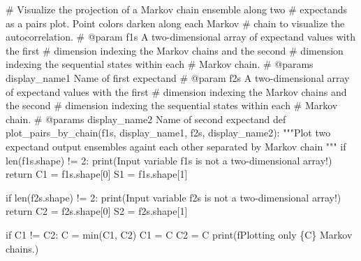 \documentclass[
  letterpaper,
  DIV=11,
  numbers=noendperiod]{scrartcl}
\newenvironment{Shaded}{\begin{snugshade}}{\end{snugshade}}
\newcommand{\BuiltInTok}[1]{\textcolor[rgb]{0.00,0.23,0.31}{#1}}
\newcommand{\CommentTok}[1]{\textcolor[rgb]{0.37,0.37,0.37}{#1}}
\newcommand{\ControlFlowTok}[1]{\textcolor[rgb]{0.00,0.23,0.31}{#1}}
\newcommand{\DecValTok}[1]{\textcolor[rgb]{0.68,0.00,0.00}{#1}}
\newcommand{\KeywordTok}[1]{\textcolor[rgb]{0.00,0.23,0.31}{#1}}
\newcommand{\NormalTok}[1]{\textcolor[rgb]{0.00,0.23,0.31}{#1}}
\newcommand{\OperatorTok}[1]{\textcolor[rgb]{0.37,0.37,0.37}{#1}}
\newcommand{\SpecialCharTok}[1]{\textcolor[rgb]{0.37,0.37,0.37}{#1}}
\newcommand{\SpecialStringTok}[1]{\textcolor[rgb]{0.13,0.47,0.30}{#1}}
\newcommand{\StringTok}[1]{\textcolor[rgb]{0.13,0.47,0.30}{#1}}
\begin{document}
\begin{Shaded}
\begin{Highlighting}[]
\CommentTok{\# Visualize the projection of a Markov chain ensemble along two}
\CommentTok{\# expectands as a pairs plot.  Point colors darken along each Markov}
\CommentTok{\# chain to visualize the autocorrelation.}
\CommentTok{\# @param f1s A two{-}dimensional array of expectand values with the first}
\CommentTok{\#            dimension indexing the Markov chains and the second}
\CommentTok{\#            dimension indexing the sequential states  within each}
\CommentTok{\#            Markov chain.}
\CommentTok{\# @params display\_name1 Name of first expectand}
\CommentTok{\# @param f2s A two{-}dimensional array of expectand values with the first}
\CommentTok{\#            dimension indexing the Markov chains and the second}
\CommentTok{\#            dimension indexing the sequential states  within each}
\CommentTok{\#            Markov chain.}
\CommentTok{\# @params display\_name2 Name of second expectand}
\KeywordTok{def}\NormalTok{ plot\_pairs\_by\_chain(f1s, display\_name1,}
\NormalTok{                        f2s, display\_name2):}
  \CommentTok{"""Plot two expectand output ensembles againt each other separated by}
\CommentTok{     Markov chain """}
  \ControlFlowTok{if} \BuiltInTok{len}\NormalTok{(f1s.shape) }\OperatorTok{!=} \DecValTok{2}\NormalTok{:}
    \BuiltInTok{print}\NormalTok{(}\StringTok{\textquotesingle{}Input variable \textasciigrave{}f1s\textasciigrave{} is not a two{-}dimensional array!\textquotesingle{}}\NormalTok{)}
    \ControlFlowTok{return}
\NormalTok{  C1 }\OperatorTok{=}\NormalTok{ f1s.shape[}\DecValTok{0}\NormalTok{]}
\NormalTok{  S1 }\OperatorTok{=}\NormalTok{ f1s.shape[}\DecValTok{1}\NormalTok{]}
  
  \ControlFlowTok{if} \BuiltInTok{len}\NormalTok{(f2s.shape) }\OperatorTok{!=} \DecValTok{2}\NormalTok{:}
    \BuiltInTok{print}\NormalTok{(}\StringTok{\textquotesingle{}Input variable \textasciigrave{}f2s\textasciigrave{} is not a two{-}dimensional array!\textquotesingle{}}\NormalTok{)}
    \ControlFlowTok{return}
\NormalTok{  C2 }\OperatorTok{=}\NormalTok{ f2s.shape[}\DecValTok{0}\NormalTok{]}
\NormalTok{  S2 }\OperatorTok{=}\NormalTok{ f2s.shape[}\DecValTok{1}\NormalTok{]}
    
  \ControlFlowTok{if}\NormalTok{ C1 }\OperatorTok{!=}\NormalTok{ C2:}
\NormalTok{    C }\OperatorTok{=} \BuiltInTok{min}\NormalTok{(C1, C2)}
\NormalTok{    C1 }\OperatorTok{=}\NormalTok{ C}
\NormalTok{    C2 }\OperatorTok{=}\NormalTok{ C}
    \BuiltInTok{print}\NormalTok{(}\SpecialStringTok{f\textquotesingle{}Plotting only }\SpecialCharTok{\{}\NormalTok{C}\SpecialCharTok{\}}\SpecialStringTok{ Markov chains.\textquotesingle{}}\NormalTok{)}
  

\end{Highlighting}
\end{Shaded}
\end{document}
